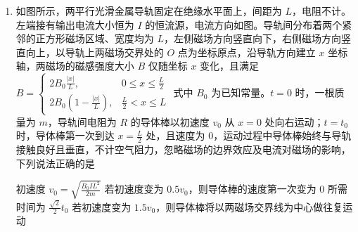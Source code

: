 \documentclass[\gkver]{gaokaozhenti}
\begin{document}
\begin{enumerate}
\item
如图所示，两平行光滑金属导轨固定在绝缘水平面上，间距为 $L$，电阻不计。左端接有输出电流大小恒为 $I$ 的恒流源，电流方向如图。导轨间分布着两个紧邻的正方形磁场区域、宽度均为 $L$，左侧磁场方向竖直向下，右侧磁场方向竖直向上，以导轨上两磁场交界处的 $O$ 点为坐标原点，沿导轨方向建立 $x$ 坐标轴，两磁场的磁感强度大小 $B$ 仅随坐标 $x$ 变化，且满足 $B = \begin{cases} 2B_{0}\frac{|x|}{L}, & 0 \le x \le \frac{L}{2} \\ 2B_{0}\left(1-\frac{|x|}{L}\right), & \frac{L}{2} < x \le L \end{cases}$ 式中 $B_{0}$ 为已知常量。$t = 0$ 时，一根质量为 $m$，导轨间电阻为 $R$ 的导体棒以初速度 $v_{0}$ 从 $x = 0$ 处向右运动；$t = t_{0}$ 时，导体棒第一次到达 $x = \frac{L}{2}$ 处，且速度为 0，运动过程中导体棒始终与导轨接触良好且垂直，不计空气阻力，忽略磁场的边界效应及电流对磁场的影响，下列说法正确的是
\onepicture[w=9.0cm]{}

{初速度 $v_{0} = \sqrt{\frac{B_{0}IL^{2}}{2m}}$}
{若初速度变为 $0.5v_{0}$，则导体棒的速度第一次变为 $0$ 所需时间为 $\frac{\sqrt{2}}{2}t_{0}$}
{若初速度变为 $1.5v_{0}$，则导体棒将以两磁场交界线为中心做往复运动}

\end{enumerate}
\end{document}
